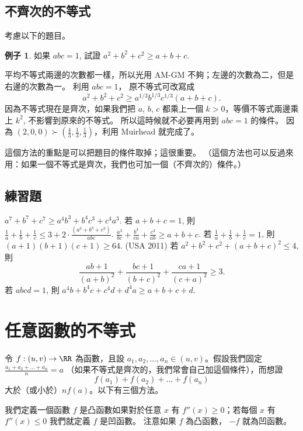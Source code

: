 \documentclass[11pt,nothm]{scrartcl}
\theoremstyle{definition}
\newtheorem{example}[theorem]{\color{blue!40!black}例子}
\let\oldendproof\endproof
\renewenvironment{proof}[1][【證】]{%
  \oldproof[\bfseries #1\nopunct]%
}{\oldendproof}
\begin{document}
\subsection{不齊次的不等式}
考慮以下的題目。
\begin{example}
  如果 $abc=1$, 試證 $a^2+b^2+c^2 \ge a+b+c$.
\end{example}
\begin{proof}
  平均不等式兩邊的次數都一樣，所以光用 AM-GM 不夠；左邊的次數為二，但是右邊的次數為一。
  利用 $abc=1$， 原不等式可改寫成
  \[ a^2+b^2+c^2 \ge a^{1/3}b^{1/3}c^{1/3} \left( a+b+c \right). \]
  因為不等式現在是齊次，如果我們把 $a$, $b$, $c$ 都乘上一個 $k>0$，等價不等式兩邊乘上 $k^2$, 不影響到原來的不等式。
  所以這時候就不必要再用到 $abc=1$ 的條件。
  因為 $(2,0,0) \succ (\frac 43, \frac 13, \frac 13)$，利用 Muirhead 就完成了。
\end{proof}

這個方法的重點是可以把題目的條件取掉；這很重要。
（這個方法也可以反過來用：如果一個不等式是齊次，我們也可加一個（不齊次的）條件。）

\subsection{練習題}
\begin{enumerate}
  \ii $a^7+b^7+c^7 \ge a^4b^3+b^4c^3+c^4a^3$.
  \ii 若 $a+b+c=1$, 則 $\frac1a + \frac 1b + \frac 1c \le 3 + 2 \cdot \frac{(a^3+b^3+c^3)}{abc}$.
  \ii $\frac{a^3}{bc} + \frac{b^3}{ca} + \frac{c^3}{ab} \ge a+b+c$.
  \ii 若 $\frac1a + \frac1b + \frac 1c =1$, 則 $(a+1)(b+1)(c+1) \ge 64$.
  \ii (USA 2011) 若 $a^2+b^2+c^2+(a+b+c)^2 \le 4$, 則
  \[ \frac{ab+1}{(a+b)^2} + \frac{bc+1}{(b+c)^2} + \frac{ca+1}{(c+a)^2} \ge 3. \]
  \ii 若 $abcd=1$, 則 $a^4b+b^4c+c^4d+d^4a \ge a+b+c+d$.
\end{enumerate}

\section{任意函數的不等式}
令 $f : (u,v) \to \RR$ 為函數，且設 $a_1, a_2, \dots, a_n \in (u,v)$。假設我們固定 $\frac{a_1+a_2 + \dots + a_n}{n} = a$
（如果不等式是齊次的，我們常會自己加這個條件），而想證
\[ f(a_1) + f(a_2) + \dots + f(a_n) \]
大於（或小於）$nf(a)$。以下有三個方法。

我們定義一個函數 $f$ 是凸函數如果對於任意 $x$ 有 $f''(x) \ge 0$；若每個 $x$ 有 $f''(x) \le 0$ 我們就定義 $f$ 是凹函數。
注意如果 $f$ 為凸函數， $-f$ 就為凹函數。
\end{document}
